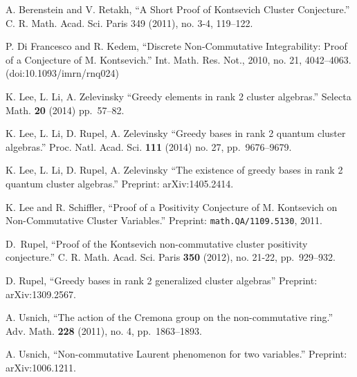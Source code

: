 \documentclass{amsart}
\begin{document}
 



 \begin{thebibliography}{xxx}

   A. Berenstein and V. Retakh, ``A Short Proof of Kontsevich Cluster Conjecture.''  C. R. Math. Acad. Sci. Paris 349 (2011), no. 3-4, 119–122.

   P. Di Francesco and R. Kedem, ``Discrete Non-Commutative Integrability: Proof of a Conjecture of M. Kontsevich.'' Int. Math. Res. Not.,  2010, no. 21, 4042–4063. (doi:10.1093/imrn/rnq024)

   K. Lee, L. Li, A. Zelevinsky ``Greedy elements in rank 2 cluster algebras.'' Selecta Math. \textbf{20} (2014) pp.~57--82.

   K. Lee, L. Li, D. Rupel, A. Zelevinsky ``Greedy bases in rank 2 quantum cluster algebras.'' Proc. Natl. Acad. Sci. \textbf{111} (2014) no. 27, pp.~9676--9679.

   K. Lee, L. Li, D. Rupel, A. Zelevinsky ``The existence of greedy bases in rank 2 quantum cluster algebras.'' Preprint: arXiv:1405.2414.

   K. Lee and R. Schiffler, ``Proof of a Positivity Conjecture of M. Kontsevich on Non-Commutative Cluster Variables.'' Preprint: \texttt{math.QA/1109.5130}, 2011.

   D.~Rupel, ``Proof of the Kontsevich non-commutative cluster positivity conjecture.'' C. R. Math. Acad. Sci. Paris \textbf{350} (2012), no. 21-22, pp.~929--932.

   D. Rupel, ``Greedy bases in rank 2 generalized cluster algebras'' Preprint: arXiv:1309.2567.

   A. Usnich, ``The action of the Cremona group on the non-commutative ring.'' Adv. Math. \textbf{228} (2011), no. 4, pp.~1863--1893.

   A. Usnich, ``Non-commutative Laurent phenomenon for two variables.'' Preprint: arXiv:1006.1211.

 \end{thebibliography}
\end{document}
